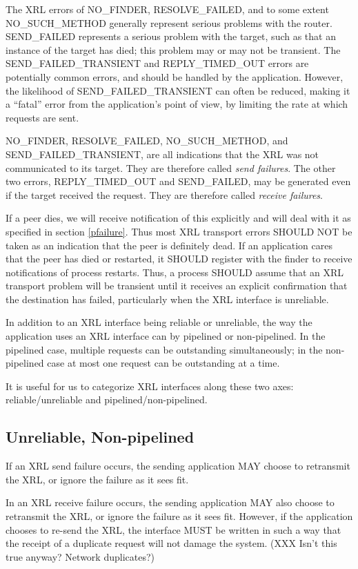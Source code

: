 \documentclass[11pt]{article}
\begin{document}
The XRL errors of NO\_FINDER, RESOLVE\_FAILED, and to some extent
NO\_SUCH\_METHOD generally represent serious problems with the router.
SEND\_FAILED represents a serious problem with the target, such as
that an instance of the target has died; this problem may or may not
be transient. The SEND\_FAILED\_TRANSIENT and REPLY\_TIMED\_OUT errors
are
potentially common errors, and should be handled by the
application. However, the likelihood of SEND\_FAILED\_TRANSIENT can
often be reduced, making it a ``fatal'' error from the application's
point of view, by limiting the rate at which requests are sent.

NO\_FINDER, RESOLVE\_FAILED, NO\_SUCH\_METHOD, and
SEND\_FAILED\_TRANSIENT, are all indications that the XRL was not
communicated to its target. They are therefore called \emph{send
failures}.  The other two errors, REPLY\_TIMED\_OUT and SEND\_FAILED,
may be generated even if the target received the request. They are
therefore called \emph{receive failures}.

If a peer dies, we will receive notification of this explicitly and
will deal with it as specified in section \ref{pfailure}. Thus most
XRL transport errors SHOULD NOT be taken as an indication that the
peer is definitely dead. If an application cares that the peer has
died or restarted, it SHOULD register with the finder to receive
notifications of process restarts. Thus, a process SHOULD assume that
an XRL transport problem will be transient until it receives an
explicit confirmation that the destination has failed, particularly
when the XRL interface is unreliable.

In addition to an XRL interface being reliable or unreliable, the way
the application uses an XRL interface can by pipelined or
non-pipelined.  In the pipelined case, multiple requests can be
outstanding simultaneously; in the non-pipelined case at most one
request can be outstanding at a time.

It is useful for us to categorize XRL interfaces along these two axes:
reliable/unreliable and pipelined/non-pipelined. 

\subsection*{Unreliable, Non-pipelined}

If an XRL send failure occurs, the sending application MAY choose to
retransmit the XRL, or ignore the failure as it sees fit.  

In an XRL receive failure occurs, the sending application MAY also choose
to retransmit the XRL, or ignore the failure as it sees fit. However, if
the application chooses to re-send the XRL, the interface MUST be written
in such a way that the receipt of a duplicate request will not damage the
system. (XXX Isn't this true anyway? Network duplicates?)
\end{document}
